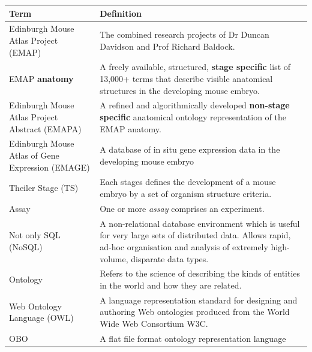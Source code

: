 \begin{center}
    \begin{tabular}{ |p{0.3\linewidth} | p{0.7\linewidth} |}
    \hline
    \textbf{Term} & \textbf{Definition} \\ \hline
    Edinburgh Mouse Atlas Project (EMAP) & The combined research projects of Dr Duncan Davidson and Prof Richard Baldock. \\ \hline
    EMAP \textbf{anatomy} & A freely available, structured, \textbf{stage specific} list of 13,000+ terms that describe visible anatomical structures in the developing mouse embryo. \\ \hline
    Edinburgh Mouse Atlas Project Abstract (EMAPA) & A refined and algorithmically developed \textbf{non-stage specific} anatomical ontology representation of the EMAP anatomy. \\ \hline
    Edinburgh Mouse Atlas of Gene Expression (EMAGE) & A database of in situ gene expression data in the developing mouse embryo  \\ \hline
    Theiler Stage (TS) & Each stages defines the development of a mouse embryo by a set of organism structure criteria. \\ \hline
    Assay & One or more \textit{assay} comprises an experiment. \\ \hline
    Not only SQL (NoSQL) & A non-relational database environment which is useful for very large sets of distributed data. Allows rapid, ad-hoc organisation and analysis of extremely high-volume, disparate data types. \\ \hline
        Ontology & Refers to the science of describing the kinds of entities in the world and how they are related. \\ \hline
            Web Ontology Language (OWL) & A language representation standard for designing and authoring Web ontologies produced from the World Wide Web Consortium W3C. \\ \hline
          OBO & A flat file format ontology representation language \\ \hline
    \end{tabular}
\end{center}

